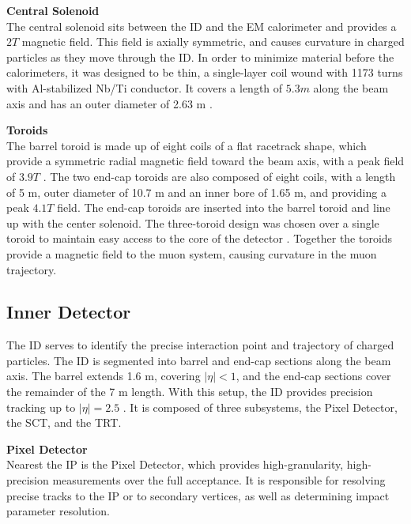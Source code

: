 \noindent\textbf{Central Solenoid}\\
\indent The central solenoid sits between the \gls{ID} and the \gls{EM} calorimeter and provides a $\unit{2}{T}$ magnetic field. This field is axially symmetric, and causes curvature in charged particles as they move through the \gls{ID}. In order to minimize material before the calorimeters, it was designed to be thin, a single-layer coil wound with 1173 turns with Al-stabilized Nb/Ti conductor. It covers a length of $\unit{5.3}{m}$ along the beam axis and has an outer diameter of 2.63 m \cite{central-solenoid}.

\noindent\textbf{Toroids}\\
\indent The barrel toroid is made up of eight coils of a flat racetrack shape, which provide a symmetric radial magnetic field toward the beam axis, with a peak field of $\unit{3.9}{T}$ \cite{barrel-toroid}. The two end-cap toroids are also composed of eight coils, with a length of 5 m, outer diameter of 10.7 m and an inner bore of 1.65 m, and providing a peak $\unit{4.1}{T}$ field. The end-cap toroids are inserted into the barrel toroid and line up with the center solenoid. The three-toroid design was chosen over a single toroid to maintain easy access to the core of the detector \cite{endcap-toroid}. Together the toroids provide a magnetic field to the muon system, causing curvature in the muon trajectory.


\subsection{Inner Detector}  \label{ssec:innerdetector}

The \gls{ID} serves to identify the precise interaction point and trajectory of charged particles. The \gls{ID} is segmented into barrel and end-cap sections along the beam axis. The barrel extends 1.6 m, covering $|\eta| < 1$, and the end-cap sections cover the remainder of the 7 m length. With this setup, the \gls{ID} provides precision tracking up to $|\eta| = 2.5$ \cite{inner-detector-tdr}. It is composed of three subsystems, the Pixel Detector, the \gls{SCT}, and the \gls{TRT}.

\noindent\textbf{Pixel Detector}\\
\indent Nearest the \gls{IP} is the Pixel Detector, which provides high-granularity, high-precision measurements over the full acceptance. It is responsible for resolving precise tracks to the \gls{IP} or to secondary vertices, as well as determining impact parameter resolution. 

